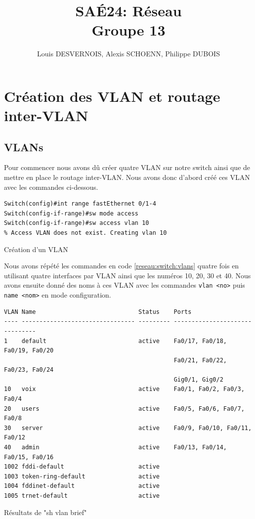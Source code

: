 \documentclass{article}
\author{Louis DESVERNOIS, Alexis SCHOENN, Philippe DUBOIS}
\title{%
    SAÉ24: Réseau \\
    \large Groupe 13}
\begin{document}
\maketitle
\tableofcontents
\listoffigures
\listoflistings

\newpage
\section{Création des VLAN et routage inter-VLAN}
\subsection{VLANs}
Pour commencer nous avons dû créer quatre VLAN sur notre switch ainsi que de mettre en place le routage inter-VLAN. 
Nous avons donc d'abord créé ces VLAN avec les commandes ci-dessous.
\begin{listing}[H]
    \begin{verbatim}
Switch(config)#int range fastEthernet 0/1-4
Switch(config-if-range)#sw mode access 
Switch(config-if-range)#sw access vlan 10
% Access VLAN does not exist. Creating vlan 10
    \end{verbatim}
    \caption{Création d'un VLAN}
    \label{reseau:switch:vlans}
\end{listing}
Nous avons répété les commandes en code \ref{reseau:switch:vlans} quatre fois en utilisant quatre interfaces par VLAN ainsi que les numéros 10, 20, 30 et 40. 
Nous avons ensuite donné des noms à ces VLAN avec les commandes \verb|vlan <no>| puis \verb|name <nom>| en mode configuration.

\begin{listing}[H]
    \begin{verbatim}
VLAN Name                             Status    Ports
---- -------------------------------- --------- -------------------------------
1    default                          active    Fa0/17, Fa0/18, Fa0/19, Fa0/20
                                                Fa0/21, Fa0/22, Fa0/23, Fa0/24
                                                Gig0/1, Gig0/2
10   voix                             active    Fa0/1, Fa0/2, Fa0/3, Fa0/4
20   users                            active    Fa0/5, Fa0/6, Fa0/7, Fa0/8
30   server                           active    Fa0/9, Fa0/10, Fa0/11, Fa0/12
40   admin                            active    Fa0/13, Fa0/14, Fa0/15, Fa0/16
1002 fddi-default                     active    
1003 token-ring-default               active    
1004 fddinet-default                  active    
1005 trnet-default                    active    
    \end{verbatim}
    \caption{Résultats de "sh vlan brief"}
    \label{reseau:switch:sh-vlan}
\end{listing}
\end{document}

